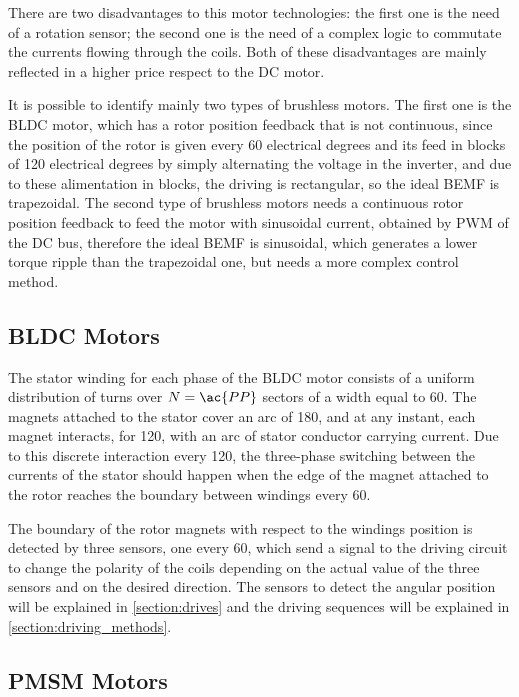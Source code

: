 There are two disadvantages to this motor technologies: the first one is the need of a rotation sensor; the second one is the need of a complex logic to commutate the currents flowing through the coils. Both of these disadvantages are mainly reflected in a higher price respect to the \ac{DC} motor.

It is possible to identify mainly two types of brushless motors. The first one is the \acf{BLDC} motor, which has a rotor position feedback that is not continuous, since the position of the rotor is given every 60 electrical degrees and its feed in blocks of 120 electrical degrees by simply alternating the voltage in the inverter, and due to these alimentation in blocks, the driving is rectangular, so the ideal \ac{BEMF} is trapezoidal. The second type of brushless motors needs a continuous rotor position feedback to feed the motor with sinusoidal current, obtained by \acf{PWM} of the \ac{DC} bus, therefore the ideal \ac{BEMF} is sinusoidal, which generates a lower torque ripple than the trapezoidal one, but needs a more complex control method.

\subsection{BLDC Motors}

The stator winding for each phase of the \ac{BLDC} motor consists of a uniform distribution of turns over $N=\ac{PP}$ sectors of a width equal to 60\degree. The magnets attached to the stator cover an arc of 180\degree, and at any instant, each magnet interacts, for 120\degree, with an arc of stator conductor carrying current. Due to this discrete interaction every 120\degree, the three-phase switching between the currents of the stator should happen when the edge of the magnet attached to the rotor reaches the boundary between windings every 60\degree.

The boundary of the rotor magnets with respect to the windings position is detected by three sensors, one every 60\degree, which send a signal to the driving circuit to change the polarity of the coils depending on the actual value of the three sensors and on the desired direction. The sensors to detect the angular position will be explained in \ref{section:drives} and the driving sequences will be explained in \ref{section:driving_methods}.


\subsection{PMSM Motors}

